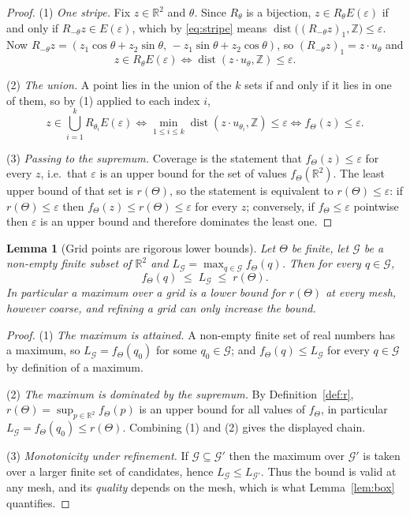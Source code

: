 \documentclass[11pt]{article}
\theoremstyle{plain}
\newtheorem{lemma}[theorem]{Lemma}
\theoremstyle{definition}
\theoremstyle{remark}
\newcommand{\dZ}{\operatorname{dist}}
\newcommand{\R}{\mathbb{R}}
\newcommand{\Z}{\mathbb{Z}}
\begin{document}
\begin{proof}
(1) \emph{One stripe.} Fix $z\in\R^2$ and $\theta$. Since $R_\theta$ is a bijection, $z\in
R_\theta E(\varepsilon)$ if and only if $R_{-\theta}z\in E(\varepsilon)$, which by \eqref{eq:stripe}
means $\dZ\big((R_{-\theta}z)_1,\Z\big)\le\varepsilon$. Now
$R_{-\theta}z=(z_1\cos\theta+z_2\sin\theta,\,-z_1\sin\theta+z_2\cos\theta)$, so
$(R_{-\theta}z)_1=z\cdot u_\theta$ and
\[
z\in R_\theta E(\varepsilon)\iff\dZ(z\cdot u_\theta,\Z)\le\varepsilon .
\]

(2) \emph{The union.} A point lies in the union of the $k$ sets if and only if it lies in one of them,
so by (1) applied to each index $i$,
\[
z\in\bigcup_{i=1}^{k}R_{\theta_i}E(\varepsilon)
\iff\min_{1\le i\le k}\dZ(z\cdot u_{\theta_i},\Z)\le\varepsilon
\iff f_\Theta(z)\le\varepsilon .
\]

(3) \emph{Passing to the supremum.} Coverage is the statement that $f_\Theta(z)\le\varepsilon$ for
every $z$, i.e.\ that $\varepsilon$ is an upper bound for the set of values $f_\Theta(\R^2)$. The least
upper bound of that set is $r(\Theta)$, so the statement is equivalent to $r(\Theta)\le\varepsilon$: if
$r(\Theta)\le\varepsilon$ then $f_\Theta(z)\le r(\Theta)\le\varepsilon$ for every $z$; conversely, if
$f_\Theta\le\varepsilon$ pointwise then $\varepsilon$ is an upper bound and therefore dominates the
least one.
\end{proof}

\begin{lemma}[Grid points are rigorous lower bounds]
\label{lem:lower}
Let $\Theta$ be finite, let $\mathcal{G}$ be a non-empty finite subset of $\R^2$ and
$L_{\mathcal{G}}=\max_{q\in\mathcal{G}}f_\Theta(q)$. Then for every $q\in\mathcal{G}$,
\[
f_\Theta(q)\;\le\;L_{\mathcal{G}}\;\le\;r(\Theta).
\]
In particular a maximum over a grid is a lower bound for $r(\Theta)$ at every mesh, however coarse, and
refining a grid can only increase the bound.
\end{lemma}

\begin{proof}
(1) \emph{The maximum is attained.} A non-empty finite set of real numbers has a maximum, so
$L_{\mathcal{G}}=f_\Theta(q_0)$ for some $q_0\in\mathcal{G}$; and $f_\Theta(q)\le L_{\mathcal{G}}$ for
every $q\in\mathcal{G}$ by definition of a maximum.

(2) \emph{The maximum is dominated by the supremum.} By Definition~\ref{def:r},
$r(\Theta)=\sup_{p\in\R^2}f_\Theta(p)$ is an upper bound for all values of $f_\Theta$, in particular
$L_{\mathcal{G}}=f_\Theta(q_0)\le r(\Theta)$. Combining (1) and (2) gives the displayed chain.

(3) \emph{Monotonicity under refinement.} If $\mathcal{G}\subseteq\mathcal{G}'$ then the maximum over
$\mathcal{G}'$ is taken over a larger finite set of candidates, hence
$L_{\mathcal{G}}\le L_{\mathcal{G}'}$. Thus the bound is valid at any mesh, and its \emph{quality}
depends on the mesh, which is what Lemma~\ref{lem:box} quantifies.
\end{proof}
\end{document}
